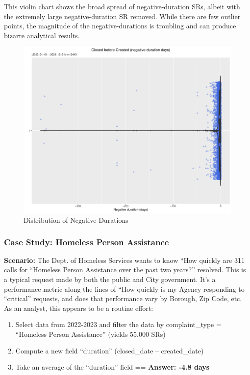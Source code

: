 \documentclass[12pt, titlepage]{article}
\begin{document}
{This violin chart shows the broad spread of negative-duration SRs, albeit with 
the extremely large negative-duration SR removed. While there are few 
outlier points, the magnitude of the negative-durations is troubling and can 
produce bizarre analytical results.

\begin{figure}[tbp]
 	 \centering
 	 \includegraphics[width = \textwidth]{negative_duration_SR_violin.pdf}
	 \caption{Distribution of Negative Durations}
	 \label{fig:negative-duration-violin}
\end{figure}


\subsubsection{Case Study: Homeless Person Assistance}
		\textbf{Scenario:} The Dept. of Homeless Services wants to 
		know ``How quickly are 311 calls for ``Homeless Person Assistance 
		over the past two years?'' resolved. This is a typical request made by 
		both the public and City government. It's a performance metric along 
		the lines of ``How quickly is my Agency responding to ``critical'' 
		requests, and does that performance vary by Borough, Zip Code, etc. 
		As an analyst, this appears to be a routine effort: 
		
		\begin{enumerate}
		    \item Select data from 2022-2023 and filter the data by 
		    complaint\_type = ``Homeless Person Assistance'' (yields 55,000 SRs)
		    \item Compute a new field ``duration'' (closed\_date – created\_date)
		    \item Take an average of the ``duration'' field == \textbf{Answer:  -4.8 days}  
		\end{enumerate}
		
}
\end{document}
